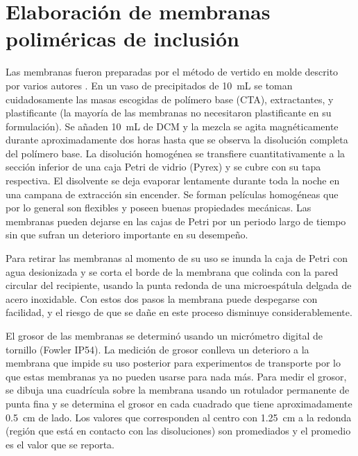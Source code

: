 \section{Elaboración de membranas poliméricas de inclusión}
Las membranas fueron preparadas por el método de vertido en molde descrito por varios autores \citep{Salazar-alvarez2005}. En un vaso de precipitados de 10~mL se toman cuidadosamente las masas escogidas de polímero base (\ac{CTA}), extractantes, y plastificante (la mayoría de las membranas no necesitaron plastificante en su formulación). Se añaden 10~mL de \ac{DCM} y la mezcla se agita magnéticamente durante aproximadamente dos horas hasta que se observa la disolución completa del polímero base. La disolución homogénea se transfiere cuantitativamente a la sección inferior de una caja Petri de vidrio (Pyrex\textregistered) y se cubre con su tapa respectiva. El disolvente se deja evaporar lentamente durante toda la noche en una campana de extracción sin encender. Se forman películas homogéneas que por lo general son flexibles y poseen buenas propiedades mecánicas. Las membranas pueden dejarse en las cajas de Petri por un periodo largo de tiempo sin que sufran un deterioro importante en su desempeño. 

Para retirar las membranas al momento de su uso se inunda la caja de Petri con agua desionizada y se corta el borde de la membrana que colinda con la pared circular del recipiente, usando la punta redonda de una microespátula delgada de acero inoxidable. Con estos dos pasos la membrana puede despegarse con facilidad, y el riesgo de que se dañe en este proceso disminuye considerablemente.

El grosor de las membranas se determinó usando un micrómetro digital de tornillo (Fowler IP54). La medición de grosor conlleva un deterioro a la membrana que impide su uso posterior para experimentos de transporte por lo que estas membranas ya no pueden usarse para nada más. Para medir el grosor, se dibuja una cuadrícula sobre la membrana usando un rotulador permanente de punta fina y se determina el grosor en cada cuadrado que tiene aproximadamente 0.5~cm de lado. Los valores que corresponden al centro con 1.25~cm a la redonda (región que está en contacto con las disoluciones) son promediados y el promedio es el valor que se reporta.

